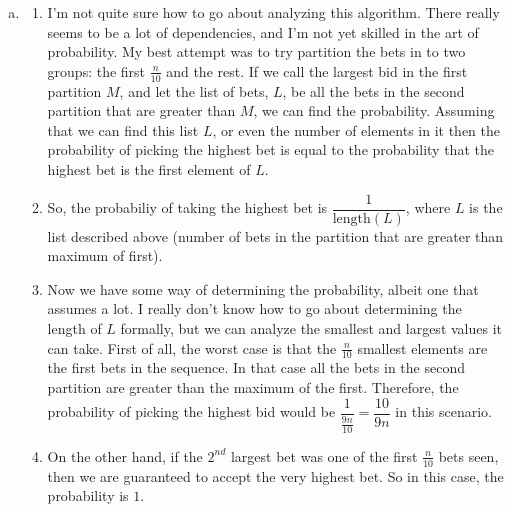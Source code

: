 \documentclass[a4paper,12pt]{article}
\begin{document}
\begin{enumerate}[a)]

\item
  \begin{enumerate}[]
    
  \item I'm not quite sure how to go about analyzing this
    algorithm. There really seems to be a lot of dependencies, and I'm
    not yet skilled in the art of probability. My best attempt was to
    try partition the bets in to two groups: the first $\frac{n}{10}$
    and the rest. If we call the largest bid in the first partition
    $M$, and let the list of bets, $L$, be all the bets in the second
    partition that are greater than $M$, we can find the
    probability. Assuming that we can find this list $L$, or even the
    number of elements in it then the probability of picking the
    highest bet is equal to the probability that the highest bet is
    the first element of $L$.

  \item So, the probabiliy of taking the highest bet is
    $\dfrac{1}{\text{length}(L)}$, where $L$ is the list described
    above (number of bets in the partition that are greater than
    maximum of first).

  \item Now we have some way of determining the probability, albeit
    one that assumes a lot. I really don't know how to go about
    determining the length of $L$ formally, but we can analyze the
    smallest and largest values it can take. First of all, the worst
    case is that the $\frac{n}{10}$ smallest elements are the first
    bets in the sequence. In that case {\italics all} the bets in the
    second partition are greater than the maximum of the
    first. Therefore, the probability of picking the highest bid would
    be $\dfrac{1}{\frac{9n}{10}} = \dfrac{10}{9n}$ in this scenario.

  \item On the other hand, if the $2^{nd}$ largest bet was one of the
    first $\frac{n}{10}$ bets seen, then we are guaranteed to accept
    the very highest bet. So in this case, the probability is $1$.

  \end{enumerate}

\end{enumerate}
\end{document}
